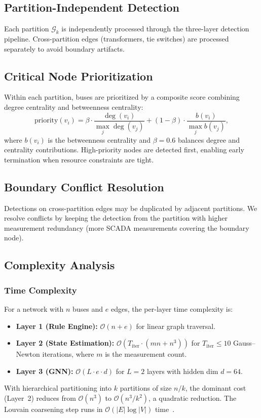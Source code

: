 \documentclass[research]{fcs}
\begin{document}
\subsection{Partition-Independent Detection}

Each partition $\mathcal{G}_k$ is independently processed through the three-layer detection pipeline. Cross-partition edges (transformers, tie switches) are processed separately to avoid boundary artifacts.

\subsection{Critical Node Prioritization}

Within each partition, buses are prioritized by a composite score combining degree centrality and betweenness centrality:
\begin{equation}
\text{priority}(v_i) = \beta \cdot \frac{\deg(v_i)}{\max_j \deg(v_j)} + (1 - \beta) \cdot \frac{b(v_i)}{\max_j b(v_j)},
\end{equation}
where $b(v_i)$ is the betweenness centrality and $\beta = 0.6$ balances degree and centrality contributions. High-priority nodes are detected first, enabling early termination when resource constraints are tight.

\subsection{Boundary Conflict Resolution}

Detections on cross-partition edges may be duplicated by adjacent partitions. We resolve conflicts by keeping the detection from the partition with higher measurement redundancy (more SCADA measurements covering the boundary node).

\subsection{Complexity Analysis}

\subsubsection{Time Complexity}
For a network with $n$ buses and $e$ edges, the per-layer time complexity is:
\begin{itemize}
\item \textbf{Layer 1 (Rule Engine):} $\mathcal{O}(n + e)$ for linear graph traversal.
\item \textbf{Layer 2 (State Estimation):} $\mathcal{O}(T_{\text{iter}} \cdot (mn + n^3))$ for $T_{\text{iter}} \leq 10$ Gauss--Newton iterations, where $m$ is the measurement count.
\item \textbf{Layer 3 (GNN):} $\mathcal{O}(L \cdot e \cdot d)$ for $L=2$ layers with hidden dim $d=64$.
\end{itemize}
With hierarchical partitioning into $k$ partitions of size $n/k$, the dominant cost (Layer~2) reduces from $\mathcal{O}(n^3)$ to $\mathcal{O}(n^3/k^2)$, a quadratic reduction. The Louvain coarsening step runs in $\mathcal{O}(|E| \log |V|)$ time~\cite{louvain2008}.
\end{document}
